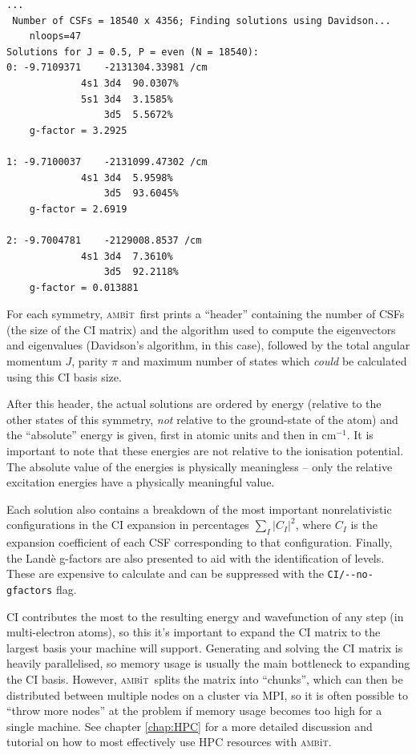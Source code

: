 \documentclass{report}
\newcommand{\ambit}{\textsc{amb}{\footnotesize i}\textsc{t}}
\begin{document}
\begin{verbatim}
...
 Number of CSFs = 18540 x 4356; Finding solutions using Davidson...
    nloops=47
Solutions for J = 0.5, P = even (N = 18540):
0: -9.7109371    -2131304.33981 /cm
             4s1 3d4  90.0307%
             5s1 3d4  3.1585%
                 3d5  5.5672%
    g-factor = 3.2925

1: -9.7100037    -2131099.47302 /cm
             4s1 3d4  5.9598%
                 3d5  93.6045%
    g-factor = 2.6919

2: -9.7004781    -2129008.8537 /cm
             4s1 3d4  7.3610%
                 3d5  92.2118%
    g-factor = 0.013881

\end{verbatim}

For each symmetry, \ambit\  first prints a ``header'' containing the number of CSFs 
(the size of the CI matrix) and the algorithm used to compute the eigenvectors and eigenvalues 
(Davidson's algorithm, in this case), followed by the total angular momentum $J$, parity $\pi$ and 
maximum number of states which \textit{could} be calculated using this CI basis size.

After this header, the actual solutions are ordered by energy (relative to the other states of this
symmetry, \emph{not} relative to the ground-state of the atom) and the ``absolute'' energy is given,
first in atomic units and then in cm$^{-1}$. It is important to note that these energies are not
relative to the ionisation potential. The absolute value of the energies is physically meaningless --
only the relative excitation energies have a physically meaningful value.

Each solution also contains a breakdown of the most important nonrelativistic configurations in the CI
expansion in percentages $\displaystyle \sum_I |C_I|^2$, where $C_I$ is the expansion coefficient of
each CSF corresponding to that configuration. Finally, the Land\`{e} g-factors are also presented to aid
with the identification of levels. These are expensive to calculate and can be suppressed with the
\texttt{CI/{-}{-}no-gfactors} flag.

CI contributes the most to the resulting energy and wavefunction of any step (in multi-electron atoms),
so this it's important to expand the CI matrix to the largest basis your machine will support.
Generating and solving the CI matrix is heavily parallelised, so memory usage is usually the main
bottleneck to expanding the CI basis. However, \ambit\  splits the matrix into ``chunks'', which can then
be distributed between multiple nodes on a cluster via MPI, so it is often possible to ``throw more
nodes'' at the problem if memory usage becomes too high for a single machine. See chapter \ref{chap:HPC}
for a more detailed discussion and tutorial on how to most effectively use HPC resources with \ambit.
\end{document}
